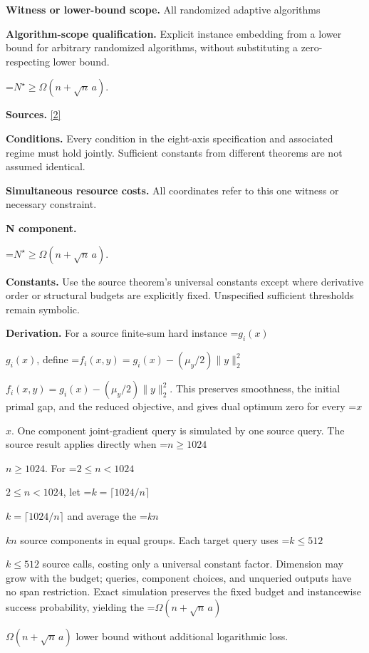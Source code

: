 \documentclass[10pt,a4paper]{article}
\newcommand{\AtlasMath}[1]{\par\begingroup\centering\setbox0=\hbox{$\displaystyle #1$}\ifdim\wd0>1.4\linewidth\typeout{ATLAS WIDE FORMULA: \the\wd0}\fi\ifdim\wd0>\linewidth\resizebox{\linewidth}{!}{\box0}\else\box0\fi\par\endgroup}
\newcommand{\AtlasInlineMath}[1]{\begingroup\setbox0=\hbox{$#1$}\ifdim\wd0>.4\linewidth\endgroup\AtlasMath{#1}\else\endgroup$#1$\fi}
\begin{document}
\textbf{Witness or lower-bound scope.} All randomized adaptive algorithms



\textbf{Algorithm-scope qualification.} Explicit instance embedding from a lower bound for arbitrary randomized algorithms, without substituting a zero-respecting lower bound.



\AtlasMath{N^\star\ge\Omega(n+\sqrt n\,a).}


\textbf{Sources.} \href{https://arxiv.org/pdf/2609.00045v3}{[2]}



\textbf{Conditions.} Every condition in the eight-axis specification and associated regime must hold jointly. Sufficient constants from different theorems are not assumed identical.



\textbf{Simultaneous resource costs.} All coordinates refer to this one witness or necessary constraint.



\textbf{N component.}



\AtlasMath{N^\star\ge\Omega(n+\sqrt n\,a).}


\textbf{Constants.} Use the source theorem’s universal constants except where derivative order or structural budgets are explicitly fixed. Unspecified sufficient thresholds remain symbolic.



\textbf{Derivation.} For a source finite-sum hard instance \AtlasInlineMath{g_i(x)}, define \AtlasInlineMath{f_i(x,y)=g_i(x)-(\mu_y/2)\|y\|_2^2}. This preserves smoothness, the initial primal gap, and the reduced objective, and gives dual optimum zero for every \AtlasInlineMath{x}. One component joint-gradient query is simulated by one source query. The source result applies directly when \AtlasInlineMath{n\ge1024}. For \AtlasInlineMath{2\le n<1024}, let \AtlasInlineMath{k=\lceil1024/n\rceil} and average the \AtlasInlineMath{kn} source components in equal groups. Each target query uses \AtlasInlineMath{k\le512} source calls, costing only a universal constant factor. Dimension may grow with the budget; queries, component choices, and unqueried outputs have no span restriction. Exact simulation preserves the fixed budget and instancewise success probability, yielding the \AtlasInlineMath{\Omega(n+\sqrt n\,a)} lower bound without additional logarithmic loss.
\end{document}
